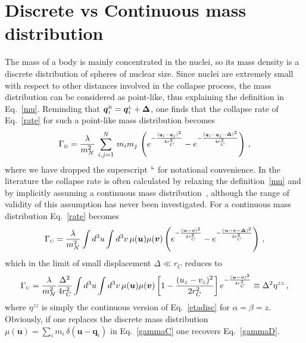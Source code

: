 \documentclass[11pt,onecolumn,amssymb,nofootinbib]{revtex4}
\newcommand\beq{\begin{equation}}
\newcommand\eeq{\end{equation}}
\begin{document}
\section{Discrete vs Continuous mass distribution}
The mass of a body is mainly concentrated in the nuclei, so its mass density is a discrete distribution of spheres of nuclear size. Since nuclei are extremely small with respect to other distances involved in the collapse process, the mass distribution can be considered as point-like, thus explaining the definition in Eq.~\eqref{mu}. Reminding that $\boldsymbol{q}^{\text{\tiny{R}}}_i=\boldsymbol{q}^{\text{\tiny{L}}}_i+\boldsymbol{\Delta}$, one finds that the collapse rate of Eq.~\eqref{rate} for such a point-like mass distribution becomes
\beq\label{gammaD}
\Gamma_\text{\tiny{D}}=\frac{\lambda}{m_N^2}\,\sum_{i,j=1}^N\, m_im_j\,\left(e^{-\frac{(\boldsymbol{q}_i-\boldsymbol{q}_j)^2}{4r_C^2}}-e^{-\frac{(\boldsymbol{q}_i-\boldsymbol{q}_j-\boldsymbol{\Delta})^2}{4r_C^2}}\right)\,,
\eeq
where we have dropped the superscript $^\text{\tiny{L}}$ for notational convenience.
In the literature the collapse rate is often calculated by relaxing the definition~\eqref{mu} and by implicitly assuming a continuous mass distribution~\cite{NimHorHam14,Beletal16,Caretal16}, although the range of validity of this assumption has never been investigated. For a continuous mass distribution Eq.~\eqref{rate} becomes
\beq\label{gammaC}
\Gamma_\text{\tiny{C}}=\frac{\lambda}{m_N^2}\int d^3u\int d^3v\, \mu(\boldsymbol{u})\mu(\boldsymbol{v})\left(e^{-\frac{(\boldsymbol{u}-\boldsymbol{v})^2}{4r_C^2}}-e^{-\frac{(\boldsymbol{u}-\boldsymbol{v}-\boldsymbol{\Delta})^2}{4r_C^2}}\right)\,,
\eeq
which in the limit of small displacement $\Delta\ll r_C$ reduces to
\beq\label{gammasmall}
\Gamma_\text{\tiny{C}}=\frac{\lambda}{m_N^2}\frac{\Delta^2}{4r_C^2}\int d^3u\int d^3v\,\mu(\boldsymbol{u}) \mu(\boldsymbol{v}) \left[1-\frac{(u_z-v_z)^2}{2r_C^2}\right] e^{-\frac{(\boldsymbol{u}-\boldsymbol{v})^2}{4r_C^2}}\equiv\Delta^2\eta^{zz}\,,
\eeq
where $\eta^{zz}$ is simply the continuous version of Eq.~\eqref{etadisc} for $\alpha=\beta=z$. Obviously, if one replaces the discrete mass distribution $\mu(\boldsymbol{u})= \sum_im_i\,\delta(\boldsymbol{u}-\boldsymbol{q}_i)$ in Eq.~\eqref{gammaC} one recovers Eq.~\eqref{gammaD}.
\end{document}
